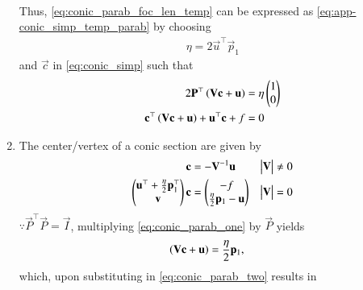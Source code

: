 \begin{enumerate}[label=\thesubsection.\arabic*.,ref=\thesubsection.\theenumi]
\begin{multline}
\label{eq:conic_parab_foc_len_temp} 
\end{multline}
Thus, \eqref{eq:conic_parab_foc_len_temp} 
can be expressed as \eqref{eq:app-conic_simp_temp_parab} by choosing
\begin{align}
\eta = 2\vec{u}^{\top}\vec{p}_1
\end{align}
and $\vec{c}$ in \eqref{eq:conic_simp} such that
\begin{align}
\label{eq:conic_parab_one}
2\mathbf{P}^{\top}\left(\mathbf{V}\mathbf{c}+\mathbf{u}\right) &= \eta\begin{pmatrix}1\\0\end{pmatrix}
\\
\mathbf{c}^{\top}\left(\mathbf{V}\mathbf{c} + \mathbf{u}\right)+ \mathbf{u}^{\top}\mathbf{c} + f&= 0
\label{eq:conic_parab_two}
\end{align}
	\item
		The center/vertex of a conic section are given by
  \begin{align}
    \label{eq:app-conic_nonparab_c}
	    \mathbf{c} &= - \mathbf{V}^{-1}\mathbf{u}  & \begin{vmatrix}\mathbf{V}\end{vmatrix} \ne 0
    \\
	    \begin{pmatrix} \mathbf{u}^{\top}+\frac{\eta}{2}\mathbf{p}_1^{\top} \\ \mathbf{v}\end{pmatrix}\mathbf{c} &= \begin{pmatrix}-f \\ \frac{\eta}{2}\mathbf{p}_1-\mathbf{u}\end{pmatrix}  
& \begin{vmatrix}\mathbf{V}\end{vmatrix} = 0
    \label{eq:conic_parab_c}
    \end{align}	
\solution	
$\because
\vec{P}^{\top}\vec{P} = \vec{I}$,
multiplying \eqref{eq:conic_parab_one} by $\vec{P}$ yields
\begin{align}
\label{eq:conic_parab_one_eig}
	\left(\mathbf{V}\mathbf{c}+\mathbf{u}\right) &= \frac{\eta}{2}\mathbf{p}_1,
\end{align}
which, upon substituting in \eqref{eq:conic_parab_two}
results in 
\begin{align}

\end{align}
\end{enumerate}
